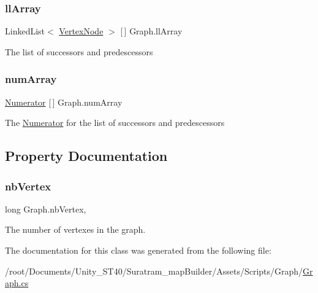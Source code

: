 \subsubsection{\texorpdfstring{ll\+Array}{llArray}}
{\footnotesize\ttfamily Linked\+List$<$ \hyperlink{classVertexNode}{Vertex\+Node} $>$ \mbox{[}$\,$\mbox{]} Graph.\+ll\+Array\hspace{0.3cm}{\ttfamily [private]}}



The list of successors and predescessors

\mbox{\label{classGraph_a376dacacf4367c7a7c26c92936cf2d9c}} 
\subsubsection{\texorpdfstring{num\+Array}{numArray}}
{\footnotesize\ttfamily \hyperlink{classNumerator}{Numerator} \mbox{[}$\,$\mbox{]} Graph.\+num\+Array\hspace{0.3cm}{\ttfamily [private]}}



The \hyperlink{classNumerator}{Numerator} for the list of successors and predescessors



\subsection{Property Documentation}
\mbox{\label{classGraph_a7d119b72cbeabd59b9aa99469754ed1c}} 
\subsubsection{\texorpdfstring{nb\+Vertex}{nbVertex}}
{\footnotesize\ttfamily long Graph.\+nb\+Vertex\hspace{0.3cm}{\ttfamily [get]}, {}}



The number of vertexes in the graph.



The documentation for this class was generated from the following file\+:\begin{DoxyCompactItemize}
\item 
/root/\+Documents/\+Unity\+\_\+\+S\+T40/\+Suratram\+\_\+map\+Builder/\+Assets/\+Scripts/\+Graph/\hyperlink{Graph_8cs}{Graph.\+cs}\end{DoxyCompactItemize}

